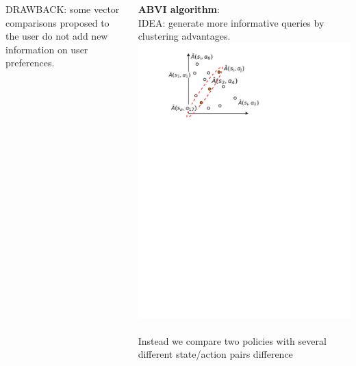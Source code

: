 \documentclass{beamer}
\begin{document}
\begin{frame}[plain]
\begin{columns}
\begin{column}{.48\textwidth}
{\color{red} DRAWBACK}: some vector comparisons proposed to the user do not add new information on user preferences.
\end{column}
\hfill
\begin{column}{.48\textwidth}
\textbf{ABVI algorithm}: ~\\
{\color{red} IDEA}: generate more informative queries by clustering advantages.
\includegraphics[width = 1.1\textwidth]{figures-new/improv-with-cluster}  ~\\
Instead we compare two policies with {\color{red}  several} different state/action pairs difference ~\\

\end{column}
\end{columns}
\end{frame}
\end{document}
